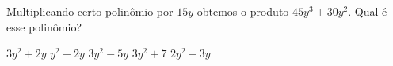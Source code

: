 Multiplicando certo polinômio por $15y$ obtemos o produto $45y^3+30y^2$. Qual é esse polinômio?

$3y^2+2y$
$y^2+2y$
$3y^2-5y$
$3y^2+7$
$2y^2-3y$



